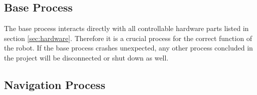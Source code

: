 \subsection{Base Process}

The base process interacts directly with all controllable hardware parts listed in section \ref{sec:hardware}. Therefore it is a crucial process for the correct function of the robot. If the base process crashes unexpected, any other process concluded in the project will be disconnected or shut down as well.\\



\subsection{Navigation Process}



